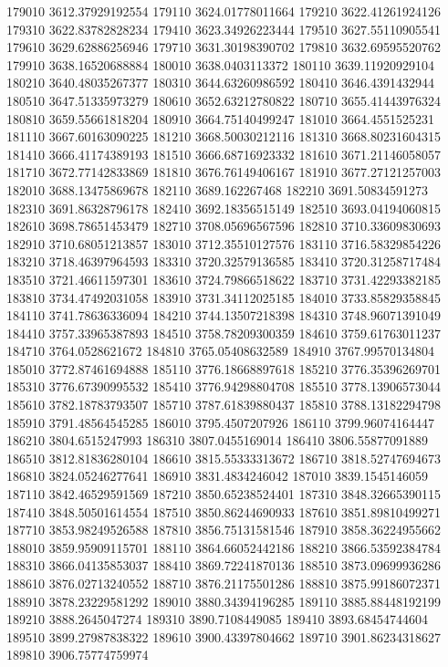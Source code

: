 {179010 3612.37929192554
179110 3624.01778011664
179210 3622.41261924126
179310 3622.83782828234
179410 3623.34926223444
179510 3627.55110905541
179610 3629.62886256946
179710 3631.30198390702
179810 3632.69595520762
179910 3638.16520688884
180010 3638.0403113372
180110 3639.11920929104
180210 3640.48035267377
180310 3644.63260986592
180410 3646.4391432944
180510 3647.51335973279
180610 3652.63212780822
180710 3655.41443976324
180810 3659.55661818204
180910 3664.75140499247
181010 3664.4551525231
181110 3667.60163090225
181210 3668.50030212116
181310 3668.80231604315
181410 3666.41174389193
181510 3666.68716923332
181610 3671.21146058057
181710 3672.77142833869
181810 3676.76149406167
181910 3677.27121257003
182010 3688.13475869678
182110 3689.162267468
182210 3691.50834591273
182310 3691.86328796178
182410 3692.18356515149
182510 3693.04194060815
182610 3698.78651453479
182710 3708.05696567596
182810 3710.33609830693
182910 3710.68051213857
183010 3712.35510127576
183110 3716.58329854226
183210 3718.46397964593
183310 3720.32579136585
183410 3720.31258717484
183510 3721.46611597301
183610 3724.79866518622
183710 3731.42293382185
183810 3734.47492031058
183910 3731.34112025185
184010 3733.85829358845
184110 3741.78636336094
184210 3744.13507218398
184310 3748.96071391049
184410 3757.33965387893
184510 3758.78209300359
184610 3759.61763011237
184710 3764.0528621672
184810 3765.05408632589
184910 3767.99570134804
185010 3772.87461694888
185110 3776.18668897618
185210 3776.35396269701
185310 3776.67390995532
185410 3776.94298804708
185510 3778.13906573044
185610 3782.18783793507
185710 3787.61839880437
185810 3788.13182294798
185910 3791.48564545285
186010 3795.4507207926
186110 3799.96074164447
186210 3804.6515247993
186310 3807.0455169014
186410 3806.55877091889
186510 3812.81836280104
186610 3815.55333313672
186710 3818.52747694673
186810 3824.05246277641
186910 3831.4834246042
187010 3839.1545146059
187110 3842.46529591569
187210 3850.65238524401
187310 3848.32665390115
187410 3848.50501614554
187510 3850.86244690933
187610 3851.89810499271
187710 3853.98249526588
187810 3856.75131581546
187910 3858.36224955662
188010 3859.95909115701
188110 3864.66052442186
188210 3866.53592384784
188310 3866.04135853037
188410 3869.72241870136
188510 3873.09699936286
188610 3876.02713240552
188710 3876.21175501286
188810 3875.99186072371
188910 3878.23229581292
189010 3880.34394196285
189110 3885.88448192199
189210 3888.2645047274
189310 3890.7108449085
189410 3893.68454744604
189510 3899.27987838322
189610 3900.43397804662
189710 3901.86234318627
189810 3906.75774759974
}
